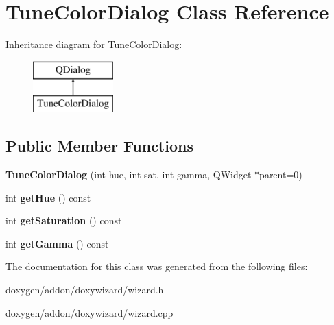 \hypertarget{class_tune_color_dialog}{}\section{Tune\+Color\+Dialog Class Reference}
\label{class_tune_color_dialog}
Inheritance diagram for Tune\+Color\+Dialog\+:\begin{figure}[H]
\begin{center}
\leavevmode
\includegraphics[height=2.000000cm]{class_tune_color_dialog}
\end{center}
\end{figure}
\subsection*{Public Member Functions}
\begin{DoxyCompactItemize}
\item 
\mbox{\label{class_tune_color_dialog_a54f1a916215961defb4c9c5227fbefa6}} 
{\bfseries Tune\+Color\+Dialog} (int hue, int sat, int gamma, Q\+Widget $\ast$parent=0)
\item 
\mbox{\label{class_tune_color_dialog_afe1f53bd6478d1b388a56ed4dda39601}} 
int {\bfseries get\+Hue} () const
\item 
\mbox{\label{class_tune_color_dialog_a94f50cb80e9d3c466daa9718128d1a08}} 
int {\bfseries get\+Saturation} () const
\item 
\mbox{\label{class_tune_color_dialog_a6404fc86c8ec18351c3c8989c4237626}} 
int {\bfseries get\+Gamma} () const
\end{DoxyCompactItemize}


The documentation for this class was generated from the following files\+:\begin{DoxyCompactItemize}
\item 
doxygen/addon/doxywizard/wizard.\+h\item 
doxygen/addon/doxywizard/wizard.\+cpp\end{DoxyCompactItemize}
